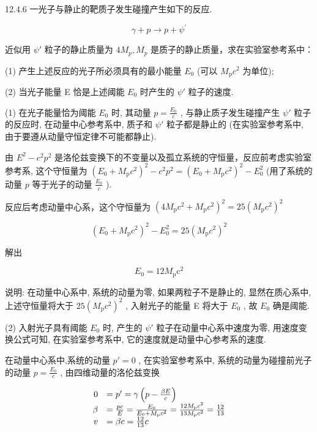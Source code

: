 \begin{problem}{12.4.6}
一光子与静止的靶质子发生碰撞产生如下的反应.

\[
\gamma + p \rightarrow p + \psi^ {\prime}
\]

近似用 $\psi'$ 粒子的静止质量为 $4M_{p}, M_{p}$ 是质子的静止质量，求在实验室参考系中：

(1) 产生上述反应的光子所必须具有的最小能量 $E_0$ (可以 $M_{\mathrm{p}}c^{2}$ 为单位);

(2) 当光子能量 E 恰是上述阈能 $E_{0}$ 时产生的 $\psi'$ 粒子的速度.

(1) 在光子能量恰为阈能 $E_0$ 时, 其动量 $p = \frac{E_0}{c}$ , 与静止质子发生碰撞产生 $\psi'$ 粒子的反应时, 在动量中心参考系中, 质子和 $\psi'$ 粒子都是静止的 (在实验室参考系中, 由于要遵从动量守恒定律不可能都静止).

由 $E^{2}-c^{2}p^{2}$ 是洛伦兹变换下的不变量以及孤立系统的守恒量，反应前考虑实验室参考系, 这个守恒量为 $(E_0 + M_{\mathrm{p}}c^2)^2 - c^2 p^2 = (E_0 + M_{\mathrm{p}}c^2)^2 - E_0^2$ (用了系统的动量 $p$ 等于光子的动量 $\frac{E_0}{c}$ ).

反应后考虑动量中心系，这个守恒量为 $(4M_{\mathrm{p}}c^{2} + M_{\mathrm{p}}c^{2})^{2} = 25(M_{\mathrm{p}}c^{2})^{2}$ 

\[
(E _ {0} + M _ {\mathrm{p}} c ^ {2}) ^ {2} - E _ {0} ^ {2} = 2 5 (M _ {\mathrm{p}} c ^ {2}) ^ {2}
\]

解出

\[
E _ {0} = 1 2 M _ {\mathrm{p}} \mathrm{c} ^ {2}
\]

说明: 在动量中心系中, 系统的动量为零, 如果两粒子不是静止的, 显然在质心系中, 上述守恒量将大于 $25(M_{\mathrm{p}}c^{2})^{2}$ , 入射光子的能量 E 将大于 $E_{0}$ , 故 $E_{0}$ 确是阈能.

(2) 入射光子具有阈能 $E_{0}$ 时, 产生的 $\psi'$ 粒子在动量中心系中速度为零, 用速度变换公式可知, 在实验室参考系中, 它的速度就是动量中心参考系的速度.

在动量中心系中,系统的动量 $p' = 0$ , 在实验室参考系中, 系统的动量为碰撞前光子的动量 $p = \frac{E_{0}}{c}$ , 由四维动量的洛伦兹变换

\[
\begin{array}{r l} 0 & = p ^ {\prime} = \gamma \left(p - \frac {\beta E}{c}\right) \\ \beta & = \frac {p c}{E} = \frac {E _ {0}}{E _ {0} + M _ {\mathrm{p}} c ^ {2}} = \frac {1 2 M _ {\mathrm{p}} c ^ {2}}{1 3 M _ {\mathrm{p}} c ^ {2}} = \frac {1 2}{1 3} \\ v & = \beta c = \frac {1 2}{1 3} c \end{array}
\]
\end{problem}
\clearpage


